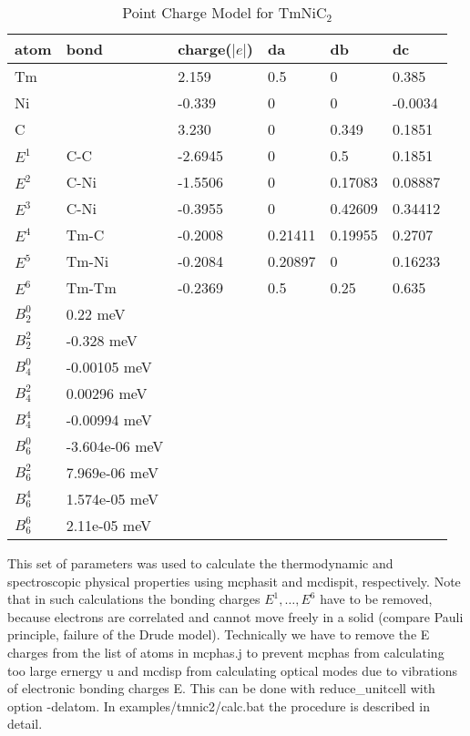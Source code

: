 \begin{table}[thb] 
\begin{center}  
\caption {Point Charge Model for TmNiC$_2$}  
\label{pcmodel} 
\begin{tabular} 
{l|l|l|l|l|l}
atom	& bond	& charge($|e|$) & da  & db    & dc \\
\hline
Tm	&	& 2.159	    & 0.5   &	0   &	0.385 \\
Ni	&	& -0.339    & 0	    &	0   &	-0.0034 \\
C	&	& 3.230	    & 0	    & 0.349 &	0.1851  \\
$E^1$	& C-C	& -2.6945   & 0	    &	0.5 &	0.1851  \\
$E^2$	& C-Ni  & -1.5506   & 0	    &	0.17083&0.08887  \\
$E^3$	& C-Ni  & -0.3955   & 0	    &	0.42609&0.34412  \\
$E^4$	& Tm-C  & -0.2008   & 0.21411&	0.19955&0.2707  \\
$E^5$	& Tm-Ni & -0.2084   & 0.20897&	0   &	0.16233  \\
$E^6$	& Tm-Tm & -0.2369   & 0.5   &	0.25&	0.635  \\
\hline
$B_2^0$ & 0.22 meV &&&\\
$B_2^2$ &-0.328 meV &&&\\
$B_4^0$ &-0.00105 meV &&&\\
$B_4^2$ & 0.00296 meV &&&\\
$B_4^4$ &-0.00994 meV &&&\\
$B_6^0$ &-3.604e-06 meV &&&\\
$B_6^2$ & 7.969e-06 meV &&&\\
$B_6^4$ & 1.574e-05 meV &&&\\
$B_6^6$ & 2.11e-05 meV &&&\\
\end{tabular}
\end{center}   
\end{table}

This set of parameters was used to calculate the thermodynamic and spectroscopic physical properties
using {\prg mcphasit} and {\prg mcdispit}, respectively. Note that in such calculations the
bonding charges $E^1, \dots, E^6$ have to be removed, because electrons are correlated and 
cannot move freely in a solid (compare Pauli principle, failure of the Drude model).
Technically we have to remove the E charges from the list of atoms in 
{\prg mcphas.j} to prevent {\prg mcphas} from calculating too large ernergy u and {\prg mcdisp} 
from calculating optical modes due to vibrations of electronic bonding charges E.
This can be done with {\prg reduce\_unitcell} with option {\prg -delatom}.
In {\prg examples/tmnic2/calc.bat } the procedure is described in detail.


